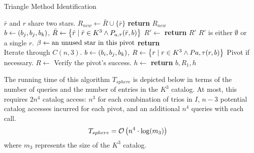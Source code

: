 \begin{algorithm}[ht]
    \caption{Triangle Method Identification} \label{algorithm:triangleIdentification}
    \begin{algorithmic}[1]
        \LineComment $\bar{r}$ and $r$ share two stars.
        \State $R_{new} \gets \bar{R} \cup \{\bar{r}\}$
        \EndIf
        \EndFor
        \State \textbf{return} $R_{new}$
        \EndFunction
        \\
        \State $b \gets (b_j, b_j, b_k)$, $\bar{R} \gets \left\{  \bar{r} \mid \bar{r} \in K^3
        \land P_{a, \tau}(\bar{r}, b)  \right\}$
        \State $R' \gets $ 
        \State \textbf{return} $R'$ \Comment $R'$ is either $\emptyset$ or a single $r$.
        \Else
        \State $\beta \gets \text{an unused star in this pivot}$
        \State \textbf{return} 
        \EndIf
        \EndFunction
        \\
          \Comment Iterate through $C(n, 3)$.
        \State $b \gets \left(b_i, b_j, b_k\right)$, $R \gets \left\{  r \mid r \in K^3
        \land P{a, \tau}(r, b)  \right\}$
         \Comment Pivot if necessary.
        \State $R \gets $ 
        \EndIf
         \Comment Verify the pivot's success.
        \State $h \gets $ 
        \invalidBijection
        \State \textbf{return} $b, R_1, h$
        \EndIf
        \EndIf
        \EndFor
        \EndFor
        \EndFor
        \EndFunction
    \end{algorithmic}
\end{algorithm}

The running time of this algorithm $T_{sphere}$ is depicted below in terms of the number of queries and the number of
entries in the $K^3$ catalog.
At most, this requires $2n^4$ catalog access: $n^3$ for each combination of trios in $I$, $n - 3$ potential catalog
accesses incurred for each pivot, and an additional $n^4$ queries with each  call.
\begin{equation}\label{eq:sphereComplexity}
    T_{sphere} = \bigO\left( n^4 \cdot \log (m_3) \right)
\end{equation}
where $m_3$ represents the size of the $K^3$ catalog.

